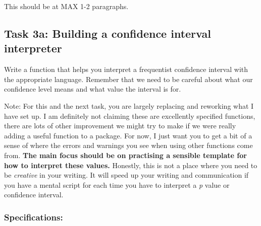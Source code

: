 \documentclass[
  openany]{book}
\begin{document}
This should be at MAX 1-2 paragraphs.

\hypertarget{task-3a-building-a-confidence-interval-interpreter}{%
\subsection{Task 3a: Building a confidence interval interpreter}\label{task-3a-building-a-confidence-interval-interpreter}}

Write a function that helps you interpret a frequentist confidence interval with the appropriate language. Remember that we need to be careful about what our confidence level means and what value the interval is for.

Note: For this and the next task, you are largely replacing and reworking what I have set up. I am definitely not claiming these are excellently specified functions, there are lots of other improvement we might try to make if we were really adding a useful function to a package. For now, I just want you to get a bit of a sense of where the errors and warnings you see when using other functions come from. \textbf{The main focus should be on practising a sensible template for how to interpret these values.} Honestly, this is not a place where you need to be \emph{creative} in your writing. It will speed up your writing and communication if you have a mental script for each time you have to interpret a \emph{p} value or confidence interval.

\hypertarget{specifications}{%
\subsubsection{Specifications:}\label{specifications}}
\end{document}
